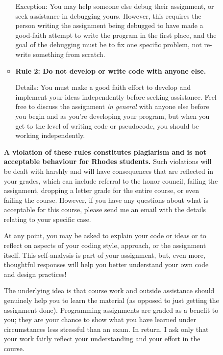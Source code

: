 \documentclass [letterpaper,11pt]{article}
\begin{document}
\begin{description}
\begin{itemize}
\begin{itemize}
                                
                Exception: You may help someone else debug their assignment, or seek assistance in debugging yours.  However, 
                this requires the person writing the assignment being debugged to have made a good-faith attempt
                to write the program in the first place, and the goal of the debugging must be to fix
                one specific problem, not re-write something from scratch.
                
                \item \textbf{Rule 2: Do not develop or write code with anyone else.}
                
                Details: You must make a good faith effort to develop and implement your ideas
                independently before seeking assistance.  Feel free to discuss the assignment \emph{in general} with anyone else
                before you begin and as you're developing your program, but when you get to the level of writing code or
                pseudocode, you should be working independently.
                
                        \end{itemize}
        
\textbf{A violation of these rules constitutes plagiarism and is not acceptable behaviour for Rhodes
students.} Such violations will be dealt with harshly and will have consequences that are
reflected in your grades, which can include referral to the honor council, failing the assignment, dropping a letter grade for
the entire course, or even failing the course. However, if you have any questions about what
is acceptable for this course, please send me an email with the details relating to your specific
case.

At any point, you may be asked to explain your code or ideas or to reflect on aspects of your
coding style, approach, or the assignment itself. This self-analysis is part of your assignment,
but, even more, thoughtful responses will help you better understand your own code and
design practices!

The underlying idea is that course work and outside assistance should genuinely help you to
learn the material (as opposed to just getting the assignment done). Programming assignments
are graded as a benefit to you; they are your chance to show what you have learned
under circumstances less stressful than an exam. In return, I ask only that your work fairly
reflect your understanding and your effort in the course.
        \end{itemize}


\end{description}
\end{document}
